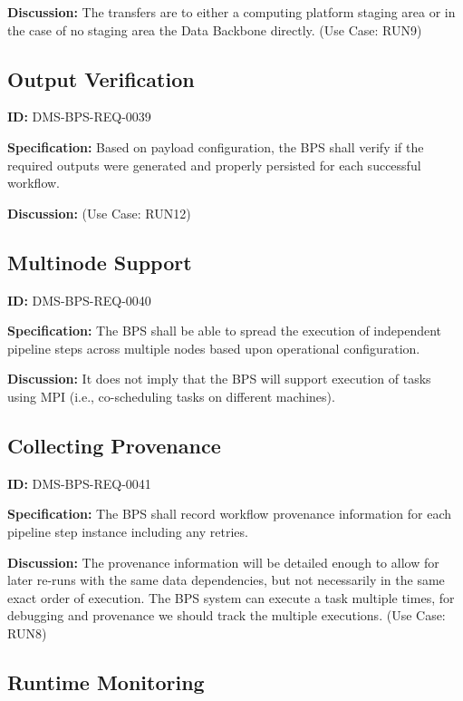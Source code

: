\documentclass[SE,toc,lsstdraft]{lsstdoc}
\begin{document}
\textbf{Discussion:}
The transfers are to either a computing platform staging area or in the case of no staging area the Data Backbone directly.  (Use Case: RUN9)

\subsection{Output Verification}

\label{DMS-BPS-REQ-0039}
\textbf{ID:} DMS-BPS-REQ-0039

\textbf{Specification:}
Based on payload configuration, the BPS shall verify if the required outputs were generated and properly persisted for each successful workflow.

\textbf{Discussion:}
(Use Case: RUN12)

\subsection{Multinode Support}

\label{DMS-BPS-REQ-0040}
\textbf{ID:} DMS-BPS-REQ-0040

\textbf{Specification:}
The BPS shall be able to spread the execution of independent pipeline steps across multiple nodes based upon operational configuration.

\textbf{Discussion:}
It does not imply that the BPS will support execution of tasks using MPI (i.e., co-scheduling tasks on different machines).

\subsection{Collecting Provenance}

\label{DMS-BPS-REQ-0041}
\textbf{ID:} DMS-BPS-REQ-0041

\textbf{Specification:}
The BPS shall record workflow provenance information for each pipeline step instance including any retries.

\textbf{Discussion:}
The provenance information will be detailed enough to allow for later re-runs with the same data dependencies, but not necessarily in the same exact order of execution.  The BPS system can execute a task multiple times, for debugging and provenance we should track the multiple executions.  (Use Case: RUN8)

\subsection{Runtime Monitoring}
\end{document}
